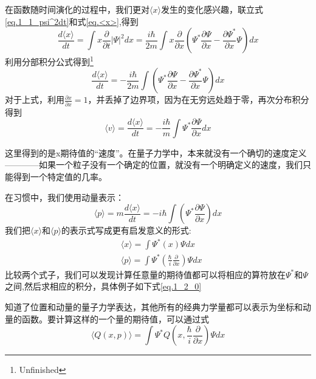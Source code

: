 		在函数随时间演化的过程中，我们更对$\langle x \rangle$发生的变化感兴趣，联立式\ref{eq.1_1_psi^2dt}和式\ref{eq.<x>},得到
		\begin{equation}
		\frac{d \langle x \rangle}{dt}=\int x \frac{\partial}{\partial t}|\Psi|^2 dx=\frac{i \hbar}{2m}\int x\frac{\partial}{\partial x}(\Psi^* \frac{\partial \Psi}{\partial x}-\frac{\partial \Psi^*}{\partial x}\Psi)dx
		\end{equation}
		利用分部积分公式得到\footnote{Unfinished}
		\begin{equation}
		\frac{d\langle x\rangle}{d t}=-\frac{i \hbar}{2 m} \int\left(\Psi^{*} \frac{\partial \Psi}{\partial x}-\frac{\partial \Psi^{*}}{\partial x} \Psi\right) d x
		\end{equation}
		对于上式，利用$\frac{\partial x}{\partial x}=1$，并丢掉了边界项，因为在无穷远处趋于零，再次分布积分得到
		\begin{equation}
		\langle v \rangle = \frac{d\langle x\rangle}{d t}=-\frac{i \hbar}{m} \int \Psi^{*} \frac{\partial \Psi}{\partial x} d x
		\end{equation}

		这里得到的是x期待值的“速度”。在量子力学中，本来就没有一个确切的速度定义————如果一个粒子没有一个确定的位置，就没有一个明确定义的速度，我们只能得到一个特定值的几率。

		在习惯中，我们使用动量表示：
		\begin{equation}
		\langle p \rangle = m \frac{d \langle x \rangle}{dt}=-i \hbar \int(\Psi^* \frac{\partial \Psi}{\partial x})dx
		\end{equation}
		我们把$\langle x \rangle$和$\langle p \rangle$的表示式写成更有启发意义的形式:
		\begin{equation}
		\begin{aligned}
		&\langle x\rangle=\int \Psi^{*}(x) \Psi d x \\
		&\langle p\rangle=\int \Psi^{*}\left(\frac{\hbar}{i} \frac{\partial}{\partial x}\right) \Psi d x
		\end{aligned}
		\end{equation}
		比较两个式子，我们可以发现计算任意量的期待值都可以将相应的算符放在$\Psi^*$和$\Psi$之间,然后求相应的积分，具体例子如下式\ref{eq.1_2_0}

		知道了位置和动量的量子力学表达，其他所有的经典力学量都可以表示为坐标和动量的函数。要计算这样的一个量的期待值，可以通过式
		\begin{equation}
		\label{eq.1_2_0}
		\langle Q(x, p)\rangle=\int \Psi^{*} Q\left(x, \frac{\hbar}{i} \frac{\partial}{\partial x}\right) \Psi d x
		\end{equation}


